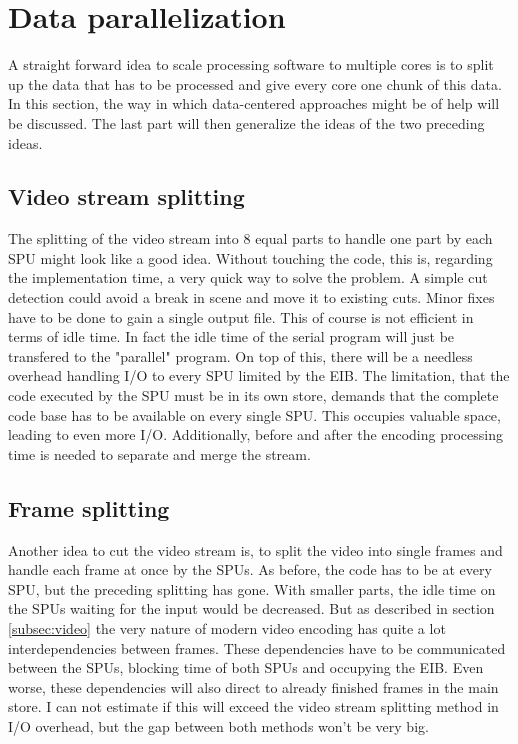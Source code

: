 \section{Data parallelization}
\label{sec:data}
A straight forward idea to scale processing software to multiple cores is to split up the data that has to be processed and give every core one chunk of this data. In this section, the way in which data-centered approaches might be of help will be discussed.  The last part will then generalize the ideas of the two preceding ideas.

\subsection{Video stream splitting}
\label{subsec:stream}
The splitting of the video stream into 8 equal parts to handle one part by each SPU might look like a good idea. Without touching the code, this is, regarding the implementation time, a very quick way to solve the problem. A simple cut detection could avoid a break in scene and move it to existing cuts. Minor fixes have to be done to gain a single output file. This of course is not efficient in terms of idle time. In fact the idle time of the serial program will just be transfered to the "parallel" program. On top of this, there will be a needless overhead handling I/O to every SPU limited by the EIB. The limitation, that the code executed by the SPU must be in its own store, demands that the complete code base has to be available on every single SPU. This occupies valuable space, leading to even more I/O. Additionally, before and after the encoding processing time is needed to separate and merge the stream. 

\subsection{Frame splitting}
\label{subsec:framesplit}
Another idea to cut the video stream is, to split the video into single frames and handle each frame at once by the SPUs. As before, the code has to be at every SPU, but the preceding splitting has gone. With smaller parts, the idle time on the SPUs waiting for the input would be decreased. But as described in section \ref{subsec:video} the very nature of modern video encoding has quite a lot interdependencies between frames. These dependencies have to be communicated between the SPUs, blocking time of both SPUs and occupying the EIB. Even worse, these dependencies will also direct to already finished frames in the main store. I can not estimate if this will exceed the video stream splitting method in I/O overhead, but the gap between both methods won't be very big.

